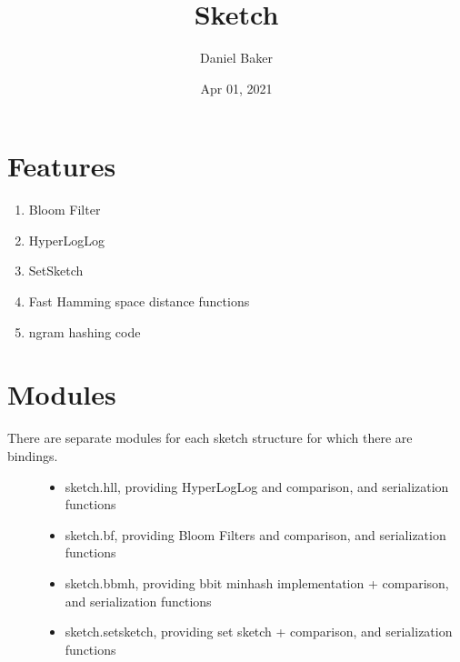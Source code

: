 \documentclass[letterpaper,10pt,english]{sphinxmanual}
\title{Sketch}
\date{Apr 01, 2021}
\author{Daniel Baker}
\begin{document}
\pagestyle{empty}
\sphinxmaketitle
\pagestyle{plain}
\sphinxtableofcontents
\pagestyle{normal}
\label{\detokenize{index::doc}}



\chapter{Features}
\label{\detokenize{index:features}}\begin{enumerate}
%
\item {}
\sphinxAtStartPar
Bloom Filter

\item {}
\sphinxAtStartPar
HyperLogLog

\item {}
\sphinxAtStartPar
SetSketch

\item {}
\sphinxAtStartPar
Fast Hamming space distance functions

\item {}
\sphinxAtStartPar
ngram hashing code

\end{enumerate}


\chapter{Modules}
\label{\detokenize{index:modules}}\begin{description}
\item[{There are separate modules for each sketch structure for which there are bindings.}] \leavevmode\begin{itemize}
\item {}
\sphinxAtStartPar
sketch.hll, providing HyperLogLog and comparison, and serialization functions

\item {}
\sphinxAtStartPar
sketch.bf, providing Bloom Filters and comparison, and serialization functions

\item {}
\sphinxAtStartPar
sketch.bbmh, providing b\sphinxhyphen{}bit minhash implementation + comparison, and serialization functions

\item {}
\sphinxAtStartPar
sketch.setsketch, providing set sketch + comparison, and serialization functions

\end{itemize}

\end{description}
\end{document}
